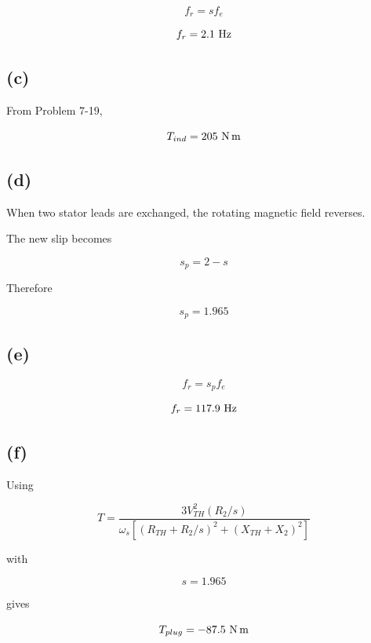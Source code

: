 \documentclass[12pt]{article}
\begin{document}
\[
f_r=sf_e
\]


\[
{f_r=2.1\ {\rm Hz}}
\]

\subsection*{(c)}

From Problem 7-19,

\[
T_{ind}=205\ {\rm N\,m}
\]

\subsection*{(d) }

When two stator leads are exchanged, the rotating magnetic field reverses.

The new slip becomes

\[
s_p=2-s
\]

Therefore

\[
{s_p=1.965}
\]

\subsection*{(e)}

\[
f_r=s_pf_e
\]

\[
{f_r=117.9\ {\rm Hz}}
\]

\subsection*{(f)}

Using

\[
T=
\frac{3V_{TH}^2(R_2/s)}
{\omega_s
	\left[
	(R_{TH}+R_2/s)^2
	+
	(X_{TH}+X_2)^2
	\right]}
\]

with

\[
s=1.965
\]

gives

\[
T_{plug}
=
-87.5\ {\rm N\,m}
\]
\end{document}
